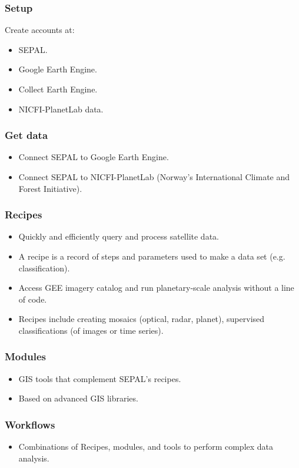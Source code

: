 \documentclass[aspectratio=169]{beamer}
\begin{document}
\begin{frame}
    \frametitle{Setup}
    Create accounts at:
    \begin{itemize}
        \item SEPAL.
        \item Google Earth Engine.
        \item Collect Earth Engine.
        \item NICFI-PlanetLab data.
    \end{itemize}
\end{frame}

\begin{frame}
    \frametitle{Get data}
    \begin{itemize}
        \item Connect SEPAL to Google Earth Engine.
        \item Connect SEPAL to NICFI-PlanetLab (Norway's International Climate 
            and Forest Initiative).
    \end{itemize}
\end{frame}

\begin{frame}
    \frametitle{Recipes}
    \begin{itemize}
        \item Quickly and efficiently query and process satellite data.
        \item A recipe is a record of steps and parameters used to make a 
            data set (e.g. classification).
        \item Access GEE imagery catalog and run planetary-scale analysis 
            without a line of code.
        \item Recipes include creating mosaics (optical, radar, planet), 
            supervised classifications (of images or time series).
    \end{itemize}
\end{frame}

\begin{frame}
    \frametitle{Modules}
    \begin{itemize}
        \item GIS tools that complement SEPAL's recipes.
        \item Based on advanced GIS libraries.
    \end{itemize}
\end{frame}

\begin{frame}
    \frametitle{Workflows}
    \begin{itemize}
        \item Combinations of Recipes, modules, and tools to perform complex
            data analysis.
    \end{itemize}
\end{frame}
\end{document}
